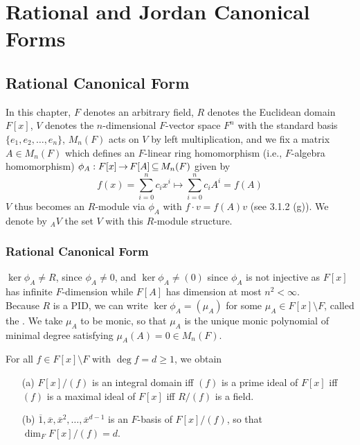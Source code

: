 \documentclass[11pt]{book}
\theoremstyle{definition}   \newtheorem{defn}[counter]{Definition} %
\newcommand{\ov}{\overline}   \newcommand{\wt}{\widetilde}
\newcommand{\bs}{\setminus}   \newcommand{\A}{\mathcal{A}}   \newcommand{\sy}{\textnormal{Syl}}   \newcommand{\size}[1]{\left| #1 \right|}
\DeclareMathOperator{\ra}{\rightarrow}   \DeclareMathOperator{\Poly}{\mathbf{P}}   \DeclareMathOperator{\spn}{\textnormal{span}}   \DeclareMathOperator{\aut}{\textnormal{Aut}}
\newcommand{\vs}{\vspace{8pt}}
\numberwithin{counter}{chapter}
\begin{document}
\part{Rational and Jordan Canonical Forms}





\chapter{Rational Canonical Form}

In this chapter, $F$ denotes an arbitrary field, $R$ denotes the Euclidean domain $F[x]$, $V$ denotes the $n$-dimensional $F$-vector space $F^n$ with the standard basis $\{e_1,e_2,\dots,e_n\}$, $M_n(F)$ acts on $V$ by left multiplication, and we fix a matrix $A \in M_n(F)$ which defines an $F$-linear ring homomorphism (i.e., $F$-algebra homomorphism) $\phi_A : F[x] \ra F[A] \sub M_n(F)$ given by
	\[f(x) = \sum_{i=0}^n c_i x^i \mapsto \sum_{i=0}^n c_i A^i = f(A) \]
$V$ thus becomes an $R$-module via $\phi_A$ with $f \cdot v = f(A) v$ (see 3.1.2 (g)). We denote by $_AV$ the set $V$ with this $R$-module structure. 

\section{Rational Canonical Form}

\begin{remark}[+ Definition]
$\ker \phi_A \ne R$, since $\phi_A \ne 0$, and $\ker \phi_A \ne (0)$ since $\phi_A$ is not injective as $F[x]$ has infinite $F$-dimension while $F[A]$ has dimension at most $n^2 < \infty$. \\

Because $R$ is a PID, we can write $\ker \phi_A = (\mu_A)$ for some $\mu_A \in F[x]\bs F$, called the . We take $\mu_A$ to be monic, so that $\mu_A$ is the unique monic polynomial of minimal degree satisfying $\mu_A(A) = 0 \in M_n(F)$. 
\end{remark}

\vs

\begin{lemma}
For all $f \in F[x]\bs F$ with $\deg f = d \geq 1$, we obtain
\begin{enumerate}
\item[(a)] $F[x]/(f)$ is an integral domain iff $(f)$ is a prime ideal of $F[x]$ iff $(f)$ is a maximal ideal of $F[x]$ iff $R/(f)$ is a field.
\item[(b)] $\ov{1}, \ov{x}, \ov{x}^2,\dots,\ov{x}^{d-1}$ is an $F$-basis of $F[x]/(f)$, so that $\dim_F F[x]/(f) = d$. 
\end{enumerate}
\end{lemma}
\end{document}

